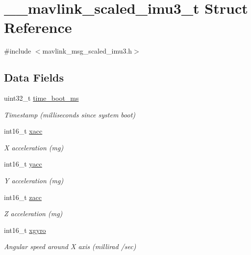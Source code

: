 \hypertarget{struct____mavlink__scaled__imu3__t}{\section{\+\_\+\+\_\+mavlink\+\_\+scaled\+\_\+imu3\+\_\+t Struct Reference}
\label{struct____mavlink__scaled__imu3__t}
}


{\ttfamily \#include $<$mavlink\+\_\+msg\+\_\+scaled\+\_\+imu3.\+h$>$}

\subsection*{Data Fields}
\begin{DoxyCompactItemize}
\item 
uint32\+\_\+t \hyperlink{struct____mavlink__scaled__imu3__t_a3b9ed7ae79c67d82b3d38b2b12d09388}{time\+\_\+boot\+\_\+ms}
\begin{DoxyCompactList}\small\item\em Timestamp (milliseconds since system boot) \end{DoxyCompactList}\item 
int16\+\_\+t \hyperlink{struct____mavlink__scaled__imu3__t_a718950143ab77de6bf119435f35f7d17}{xacc}
\begin{DoxyCompactList}\small\item\em X acceleration (mg) \end{DoxyCompactList}\item 
int16\+\_\+t \hyperlink{struct____mavlink__scaled__imu3__t_a34c27262190a9608ccd50f37e09b4397}{yacc}
\begin{DoxyCompactList}\small\item\em Y acceleration (mg) \end{DoxyCompactList}\item 
int16\+\_\+t \hyperlink{struct____mavlink__scaled__imu3__t_ab68d15d82dc70c7c085da5dfcbec8345}{zacc}
\begin{DoxyCompactList}\small\item\em Z acceleration (mg) \end{DoxyCompactList}\item 
int16\+\_\+t \hyperlink{struct____mavlink__scaled__imu3__t_ac7e09e14e4b14756d2ca5a0db5165110}{xgyro}
\begin{DoxyCompactList}\small\item\em Angular speed around X axis (millirad /sec) \end{DoxyCompactList}\item 

\end{DoxyCompactItemize}
